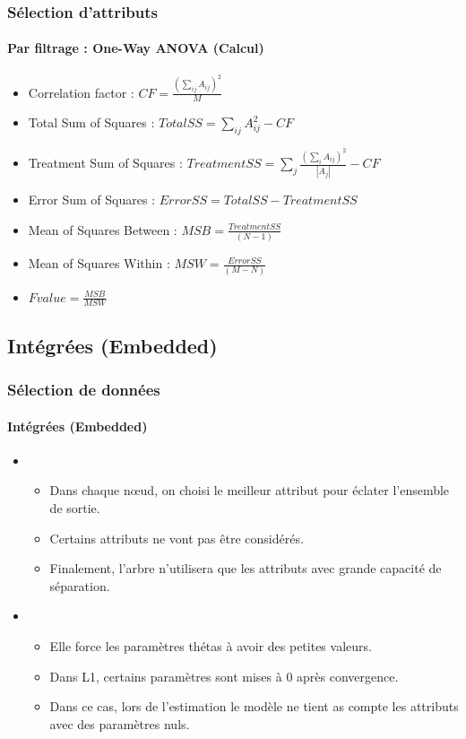 \documentclass[xcolor=table]{beamer}
\begin{document}
\begin{frame}
	\frametitle{Sélection d'attributs}
	\framesubtitle{Par filtrage : One-Way ANOVA (Calcul)}
	
	\begin{itemize}
		\item Correlation factor : $CF = \frac{(\sum_{ij} A_{ij})^2}{M} $
		\item Total Sum of Squares : $TotalSS = \sum_{ij} A_{ij}^2 - CF$
		\item Treatment Sum of Squares : $TreatmentSS = \sum_j \frac{(\sum_{i} A_{ij})^2}{|A_j|} - CF$
		\item Error Sum of Squares : $ErrorSS = TotalSS - TreatmentSS$
		\item Mean of Squares Between : $MSB = \frac{TreatmentSS}{(N - 1)}$
		\item Mean of Squares Within : $MSW =  \frac{ErrorSS}{(M - N)}$
		\item $Fvalue = \frac{MSB}{MSW}$
	\end{itemize}
	
\end{frame}

\subsection{Intégrées (Embedded)}

\begin{frame}
	\frametitle{Sélection de données}
	\framesubtitle{Intégrées (Embedded)}
	
	\begin{itemize}
		\item {}
		\begin{itemize}
			\item Dans chaque nœud, on choisi le meilleur attribut pour éclater l'ensemble de sortie.
			\item Certains attributs ne vont pas être considérés.
			\item Finalement, l'arbre n'utilisera que les attributs avec grande capacité de séparation.
		\end{itemize}
		\item {}
		\begin{itemize}
			\item Elle force les paramètres thétas à avoir des petites valeurs.
			\item Dans L1, certains paramètres sont mises à 0 après convergence.
			\item Dans ce cas, lors de l'estimation le modèle ne tient as compte les attributs avec des paramètres nuls.
		\end{itemize}
	\end{itemize}
	
\end{frame}
\end{document}
